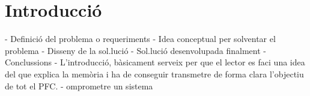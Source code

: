 \section{Introducció}

        - Definició del problema o requeriments
        - Idea conceptual per solventar el problema
        - Disseny de la sol.lució
        - Sol.lució desenvolupada finalment
        - Conclussions
- L'introducció, bàsicament serveix per que el
        lector es faci una idea del que explica la memòria
        i ha de conseguir transmetre de forma clara
        l'objectiu de tot el PFC.
- omprometre un sistema
